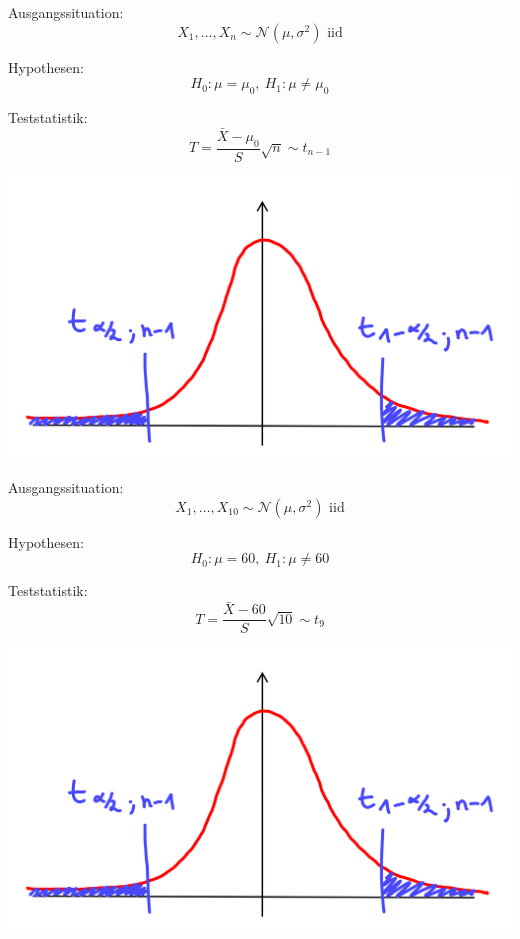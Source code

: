 \documentclass[t,11pt,aspectratio=169]{beamer}
\begin{document}
\begin{frame}
Ausgangssituation:
$$ X_1,\dots,X_n\sim \mathcal{N}(\mu,\sigma^2)\text{~iid} $$

Hypothesen:
$$H_0:\mu=\mu_0,~H_1:\mu\neq\mu_0$$

Teststatistik:
$$ T=\frac{\bar{X}-\mu_0}{S}\sqrt{n} \sim t_{n-1} $$
\begin{center}
\includegraphics[scale=0.2]{5.png}
\end{center}
\end{frame}

\begin{frame}
Ausgangssituation:
$$ X_1,\dots,X_{10}\sim \mathcal{N}(\mu,\sigma^2)\text{~iid} $$

Hypothesen:
$$H_0:\mu=60,~H_1:\mu\neq 60$$

Teststatistik:
$$ T=\frac{\bar{X}-60}{S}\sqrt{10} \sim t_{9} $$
\begin{center}
\includegraphics[scale=0.2]{5.png}
\end{center}
\end{frame}
\end{document}
